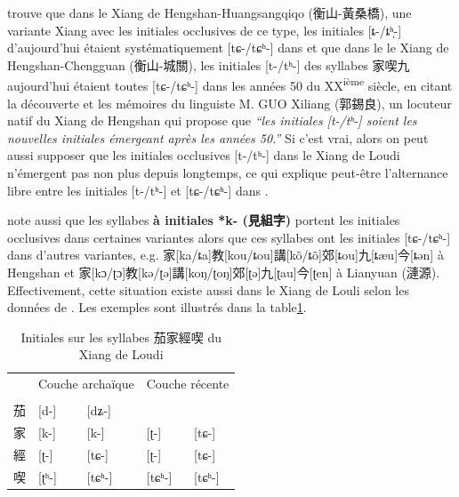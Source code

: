 \documentclass{scrbook}
\newcounter{c}[subsubsection]
\newcommand{\illustre}{Les exemples sont illustrés dans la table\xspace}
\newcommand{\termyyx}[1]{\textbf{#1}}
\begin{document}
\begin{sloppypar}
\textcite[74]{Peng2010xiang} trouve que dans le Xiang de Hengshan-Huangsangqiqo (衡山-黃桑橋), une variante Xiang avec les initiales occlusives de ce type, les initiales [ȶ-/ȶʰ̩-] d'aujourd'hui étaient systématiquement [tɕ-/tɕʰ-] dans \textcite{Yang1974hunan} et que dans le le Xiang de Hengshan-Chengguan (衡山-城關), les initiales [t-/tʰ-] des syllabes 家喫九 aujourd'hui étaient toutes [tɕ-/tɕʰ-] dans les années 50 du XX\textsuperscript{ième} siècle, en citant la découverte et les mémoires du linguiste M. GUO Xiliang (郭錫良), un locuteur natif du Xiang de Hengshan qui propose que \textit{``les initiales [t-/tʰ-] soient les nouvelles initiales émergeant après les années 50.''} Si c'est vrai, alors on peut aussi supposer que les initiales occlusives [t-/tʰ-] dans le Xiang de Loudi n'émergent pas non plus depuis longtemps, ce qui explique peut-être l'alternance libre entre les initiales [t-/tʰ-] et [tɕ-/tɕʰ-] dans \textcite[12]{Yan1994Loudi}. 

\textcite[73--74]{Peng2010xiang} note aussi que les syllabes \termyyx{à initiales *k- (見組字)} portent les initiales occlusives dans certaines variantes alors que ces syllabes ont les initiales [tɕ-/tɕʰ-] dans d'autres variantes, e.g. 家[ka/ȶa]教[kou/ȶou]講[kõ/ȶõ]郊[ȶou]九[ȶæu]今[ȶən] à Hengshan et 家[kɔ/ʈɔ]教[kə/ʈə]講[koŋ/ʈoŋ]郊[ʈə]九[ʈau]今[ʈen] à Lianyuan (漣源). Effectivement, cette situation existe aussi dans le Xiang de Louli selon les données de \textcite{Chen2006xiang}. \illustre \ref{tab:exemple_t_loudi}.

\begin{table}[htbp]
  \centering
    \begin{tabular}{lllll}
    \toprule
          & \multicolumn{2}{c}{Couche archaïque} & \multicolumn{2}{c}{Couche récente} \\
          & \textcite{Chen2006xiang} & \textcite{Yan1994Loudi} & \textcite{Chen2006xiang} & \textcite{Yan1994Loudi} \\
    \midrule
    茄     & \cellcolor[rgb]{ .851,  .851,  .851}[d-]  & [dʑ-] &       &  \\
    家     & [k-]  & [k-]  & \cellcolor[rgb]{ .851,  .851,  .851}[ʈ-] & [tɕ-] \\
    經     & \cellcolor[rgb]{ .851,  .851,  .851}[ʈ-] & [tɕ-] & \cellcolor[rgb]{ .851,  .851,  .851}[ʈ-] & [tɕ-] \\
    喫     & \cellcolor[rgb]{ .851,  .851,  .851}[ʈʰ-] & [tɕʰ-] & [tɕʰ-] & [tɕʰ-] \\
    \bottomrule
    \end{tabular}%
  \caption{Initiales sur les syllabes 茄家經喫 du Xiang de Loudi}
  \label{tab:exemple_t_loudi}%
\end{table}%


\end{sloppypar}
\end{document}
